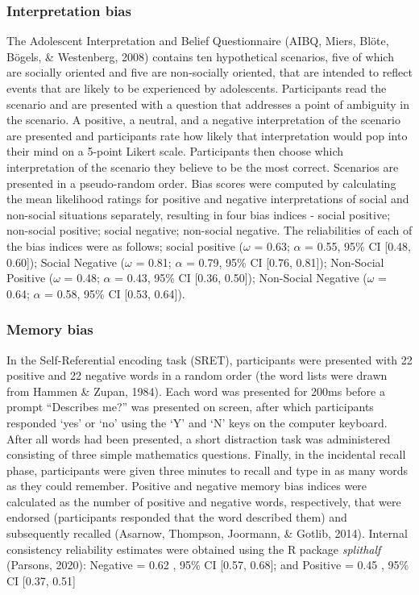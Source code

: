 \documentclass[
  english,
  man]{apa6}
\begin{document}
\hypertarget{interpretation-bias}{%
\subsubsection{Interpretation bias}\label{interpretation-bias}}

The Adolescent Interpretation and Belief Questionnaire (AIBQ, Miers, Blöte, Bögels, \& Westenberg, 2008) contains ten hypothetical scenarios, five of which are socially oriented and five are non-socially oriented, that are intended to reflect events that are likely to be experienced by adolescents. Participants read the scenario and are presented with a question that addresses a point of ambiguity in the scenario. A positive, a neutral, and a negative interpretation of the scenario are presented and participants rate how likely that interpretation would pop into their mind on a 5-point Likert scale. Participants then choose which interpretation of the scenario they believe to be the most correct. Scenarios are presented in a pseudo-random order. Bias scores were computed by calculating the mean likelihood ratings for positive and negative interpretations of social and non-social situations separately, resulting in four bias indices - social positive; non-social positive; social negative; non-social negative. The reliabilities of each of the bias indices were as follows; social positive (\(\omega\) = 0.63; \(\alpha\) = 0.55, 95\% CI {[}0.48, 0.60{]}); Social Negative (\(\omega\) = 0.81; \(\alpha\) = 0.79, 95\% CI {[}0.76, 0.81{]}); Non-Social Positive (\(\omega\) = 0.48; \(\alpha\) = 0.43, 95\% CI {[}0.36, 0.50{]}); Non-Social Negative (\(\omega\) = 0.64; \(\alpha\) = 0.58, 95\% CI {[}0.53, 0.64{]}).

\hypertarget{memory-bias}{%
\subsubsection{Memory bias}\label{memory-bias}}

In the Self-Referential encoding task (SRET), participants were presented with 22 positive and 22 negative words in a random order (the word lists were drawn from Hammen \& Zupan, 1984). Each word was presented for 200ms before a prompt ``Describes me?'' was presented on screen, after which participants responded `yes' or `no' using the `Y' and `N' keys on the computer keyboard. After all words had been presented, a short distraction task was administered consisting of three simple mathematics questions. Finally, in the incidental recall phase, participants were given three minutes to recall and type in as many words as they could remember. Positive and negative memory bias indices were calculated as the number of positive and negative words, respectively, that were endorsed (participants responded that the word described them) and subsequently recalled (Asarnow, Thompson, Joormann, \& Gotlib, 2014). Internal consistency reliability estimates were obtained using the R package \emph{splithalf} (Parsons, 2020): Negative = 0.62 , 95\% CI {[}0.57, 0.68{]}; and Positive = 0.45 , 95\% CI {[}0.37, 0.51{]}
\end{document}
